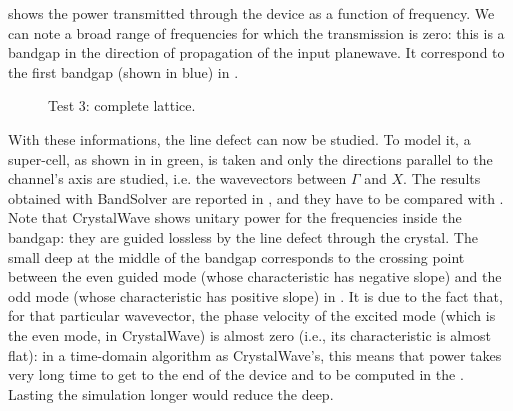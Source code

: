   shows the power transmitted
through the device as a function of frequency. We can note a broad
range of frequencies for which the transmission is zero: this is a
bandgap in the direction of propagation of the input planewave. It
correspond to the first bandgap (shown in blue) in
.

\begin{figure}[htbp]
  \begin{center}
  \end{center}
  \caption{Test 3: complete lattice.}
  \label{fig:test_3}
\end{figure}

With these informations, the line defect can now be studied. To model it, a super-cell, as shown
in  in green, is taken and only the
directions parallel to the channel's axis are studied, i.e. the
wavevectors between $\Gamma$ and $X$. The results
obtained with BandSolver are reported in
, and they have to be compared with
. Note that CrystalWave shows unitary
power for the frequencies inside the bandgap: they are guided
lossless by the line defect through the crystal. The small deep at
the middle of the bandgap corresponds to the crossing point between
the even guided mode (whose characteristic has negative slope) and the
odd mode (whose characteristic has positive slope) in
. It is due to the fact that, for that
particular wavevector, the phase
velocity of the excited mode (which is the even mode, in CrystalWave)
is almost zero (i.e., its characteristic is almost flat): in a time-domain
algorithm as CrystalWave's, this means that power takes very long time to
get to the end of the device and to be computed in the \FFT. Lasting the
simulation longer would reduce the deep.

